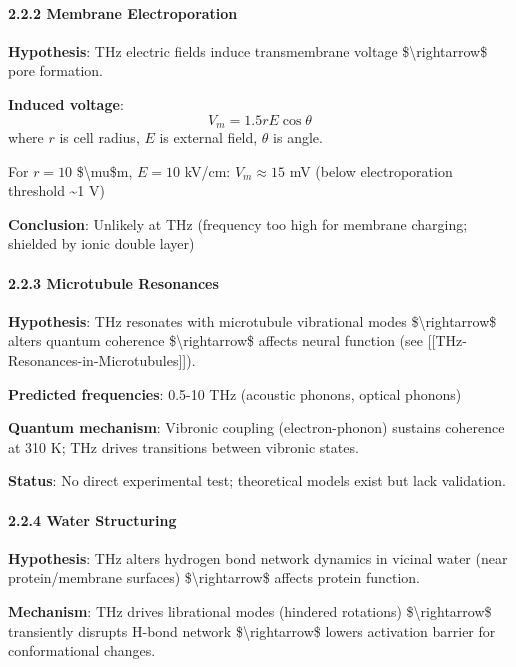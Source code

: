 \paragraph{2.2.2 Membrane
Electroporation}\label{membrane-electroporation}

\textbf{Hypothesis}: THz electric fields induce transmembrane voltage
\$\textbackslash rightarrow\$ pore formation.

\textbf{Induced voltage}: \[V_m = 1.5 r E \cos\theta\] where \(r\) is
cell radius, \(E\) is external field, \(\theta\) is angle.

For \(r = 10\) \$\textbackslash mu\$m, \(E = 10\) kV/cm:
\(V_m \approx 15\) mV (below electroporation threshold \textasciitilde1
V)

\textbf{Conclusion}: Unlikely at THz (frequency too high for membrane
charging; shielded by ionic double layer)

\paragraph{2.2.3 Microtubule Resonances}\label{microtubule-resonances}

\textbf{Hypothesis}: THz resonates with microtubule vibrational modes
\$\textbackslash rightarrow\$ alters quantum coherence
\$\textbackslash rightarrow\$ affects neural function (see
{[}{[}THz-Resonances-in-Microtubules{]}{]}).

\textbf{Predicted frequencies}: 0.5-10 THz (acoustic phonons, optical
phonons)

\textbf{Quantum mechanism}: Vibronic coupling (electron-phonon) sustains
coherence at 310 K; THz drives transitions between vibronic states.

\textbf{Status}: No direct experimental test; theoretical models exist
but lack validation.

\paragraph{2.2.4 Water Structuring}\label{water-structuring}

\textbf{Hypothesis}: THz alters hydrogen bond network dynamics in
vicinal water (near protein/membrane surfaces)
\$\textbackslash rightarrow\$ affects protein function.

\textbf{Mechanism}: THz drives librational modes (hindered rotations)
\$\textbackslash rightarrow\$ transiently disrupts H-bond network
\$\textbackslash rightarrow\$ lowers activation barrier for
conformational changes.

